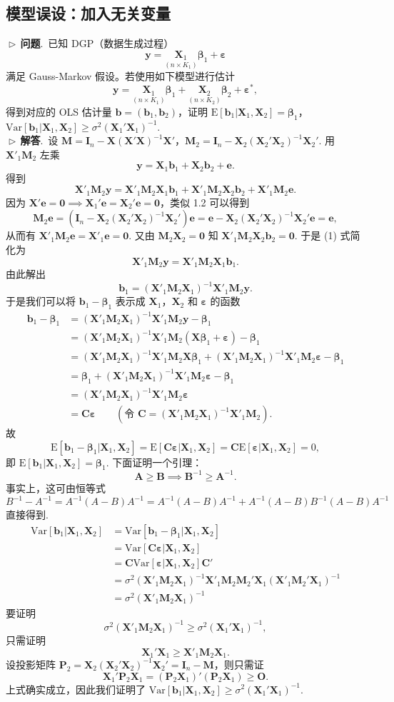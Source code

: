 \documentclass{article}
\newcommand{\E}{\mathrm{E}}
\newcommand{\Var}{\mathrm{Var}}
\newcommand{\y}{\mathbf{y}}
\newcommand{\X}{\mathbf{X}}
\newcommand{\M}{\mathbf{M}}
\newcommand{\e}{\mathbf{e}}
\newcommand{\0}{\mathbf{0}}
\newcommand{\vbe}{\bm{\beta}}
\newcommand{\vep}{\bm{\varepsilon}}
\newcommand{\vb}{\mathbf{b}}
\newcommand{\pro}{\noindent$\vartriangleright\,$\textbf{问题}.\ }
\newcommand{\sol}{\noindent$\vartriangleright\,$\textbf{解答}.\ }
\begin{document}
\subsection{模型误设：加入无关变量}
\pro 已知 DGP（数据生成过程）
\[
\y = \underset{(n\times K_1)}{\X_1}\vbe_1 +\vep
\]
满足 Gauss-Markov 假设。若使用如下模型进行估计
\[
\y = \underset{(n\times K_1)}{\X_1} \vbe_1 +\underset{(n\times K_2)}{\X_2} \vbe_2+\vep^*,
\]
得到对应的 OLS 估计量 $\vb=(\vb_1,\vb_2)$，证明 $\E[\vb_1|\X_1,\X_2]=\vbe_1$，$\Var[\vb_1|\X_1,\X_2]\ge\sigma^2(\X_1'\X_1)^{-1}$.\\

\sol 设 $\M=\mathbf{I}_n-\X(\X'\X)^{-1}\X'$，$\M_2=\mathbf{I}_n-\X_2(\X_2'\X_2)^{-1}\X_2'$. 用 $\X'_1\M_2$ 左乘
\[
\y = \X_1\vb_1 +\X_2 \vb_2+\e.
\]
得到
\begin{equation}
	\X'_1\M_2\y = \X'_1\M_2\X_1\vb_1 +\X'_1\M_2\X_2 \vb_2+\X'_1\M_2\e.
\end{equation}
因为 $\X'\e=\0\implies\X_1'\e=\X_2'\e=\0$，类似 1.2 可以得到
\[
\M_2\e=(\mathbf{I}_n-\X_2(\X_2'\X_2)^{-1}\X_2')\e=\e-\X_2(\X_2'\X_2)^{-1}\X_2'\e=\e,
\]
从而有 $\X'_1\M_2\e=\X'_1\e=\0$. 又由 $\M_2\X_2=\0$ 知 $\X'_1\M_2\X_2 \vb_2=\0$. 于是 (1) 式简化为
\[
\X'_1\M_2\y = \X'_1\M_2\X_1\vb_1 .
\]
由此解出
\[
\vb_1=(\X'_1\M_2\X_1)^{-1}\X'_1\M_2\y.
\]
于是我们可以将 $\vb_1-\vbe_1$ 表示成 $\X_1$，$\X_2$ 和 $\vep$ 的函数
\begin{align*}
\vb_1-\vbe_1&=(\X'_1\M_2\X_1)^{-1}\X'_1\M_2\y-\vbe_1\\
&=(\X'_1\M_2\X_1)^{-1}\X'_1\M_2(\X\vbe_1+\vep)-\vbe_1\\
&=(\X'_1\M_2\X_1)^{-1}\X'_1\M_2\X\vbe_1+(\X'_1\M_2\X_1)^{-1}\X'_1\M_2\vep-\vbe_1\\
&=\vbe_1+(\X'_1\M_2\X_1)^{-1}\X'_1\M_2\vep-\vbe_1\\
&=(\X'_1\M_2\X_1)^{-1}\X'_1\M_2\vep\\
&=\mathbf{C}\vep\qquad(\text{令 } \mathbf{C}=(\X'_1\M_2\X_1)^{-1}\X'_1\M_2).
\end{align*}
故
\[
\E[\vb_1-\vbe_1|\X_1,\X_2]=\E[\mathbf{C}\vep|\X_1,\X_2]=\mathbf{C}\E[\vep|\X_1,\X_2]=0,
\]
即 $\E[\vb_1|\X_1,\X_2]=\vbe_1$. 下面证明一个引理：
\[
\mathbf{A}\ge\mathbf{B}\implies\mathbf{B}^{-1}\ge\mathbf{A}^{-1}.
\]
事实上，这可由恒等式
\[
B^{-1}-A^{-1} = A^{-1}(A-B)A^{-1}
=A^{-1}(A-B)A^{-1} + A^{-1}(A-B)B^{-1}(A-B)A^{-1}
\]
直接得到.
\begin{align*}
\Var[\vb_1|\X_1,\X_2]&=\Var[\vb_1-\vbe_1|\X_1,\X_2]\\
&=\Var[\mathbf{C}\vep|\X_1,\X_2]\\
&=\mathbf{C}\Var[\vep|\X_1,\X_2]\mathbf{C}'\\
&=\sigma^2(\X'_1\M_2\X_1)^{-1}\X'_1\M_2\M_2'\X_1(\X'_1\M_2'\X_1)^{-1}\\
&=\sigma^2(\X'_1\M_2\X_1)^{-1}
\end{align*}
要证明
\[
\sigma^2(\X'_1\M_2\X_1)^{-1}\ge\sigma^2(\X_1'\X_1)^{-1},
\]
只需证明
\[
\X_1'\X_1\ge\X'_1\M_2\X_1.
\]
设投影矩阵 $\mathbf{P}_2=\X_2(\X_2'\X_2)^{-1}\X_2'=\mathbf{I}_n-\M$，则只需证
\[
\X_1'\mathbf{P}_2\X_1=(\mathbf{P}_2\X_1)'(\mathbf{P}_2\X_1)\ge\mathbf{O}.
\]
上式确实成立，因此我们证明了 $\Var[\vb_1|\X_1,\X_2]\ge\sigma^2(\X_1'\X_1)^{-1}$.
\end{document}
